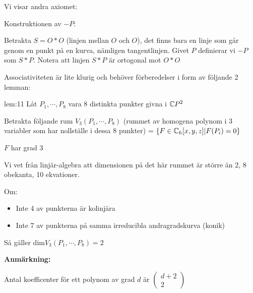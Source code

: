 \par\bigskip
\noindent Vi visar andra axiomet:\par
\noindent Konstruktionen av $-P$:\par
Betrakta $S = O*O$ (linjen mellan $O$ och $O$), det finns bara en linje som går genom en punkt på en kurva, nämligen tangentlinjen. Givet $P$ definierar vi $-P$ som $S*P$. Notera att linjen $S*P$ är ortogonal mot $O*O$
\par\bigskip
\noindent Associativiteten är lite klurig och behöver förberedelser i form av följande 2 lemman:
\par\bigskip
\begin{lem}[1]{lem:11}
  Låt $P_1,\cdots, P_8$ vara 8 distinkta punkter givna i $\mathbb{C} P^2$\par
  \noindent Betrakta följande rum $V_3(P_1,\cdots, P_8)$ (rummet av homogena polynom i 3 variabler som har nollställe i dessa 8 punkter) = $\left\{F\in\mathbb{C}_h[x,y,z]|F(P_i) = 0\right\}$\par
  \noindent $F$ har grad 3
  \par\bigskip
  \noindent Vi vet från linjär-algebra att dimensionen på det här rummet är större än 2, 8 obekanta, 10 ekvationer. 
  \par\bigskip
  \noindent Om:\par
  \begin{itemize}
    \item Inte 4 av punkterna är kolinjära
    \item Inte 7 av punkterna på samma irreducibla andragradskurva (konik)
  \end{itemize}\par
  \noindent Så gäller dim$V_3(P_1,\cdots, P_8) = 2$ 
\end{lem}
\par\bigskip
\noindent\textbf{Anmärkning:}\par
\noindent Antal koefficenter för ett polynom av grad $d$ är $\begin{pmatrix}d+2\\2\end{pmatrix}$
\par\bigskip
